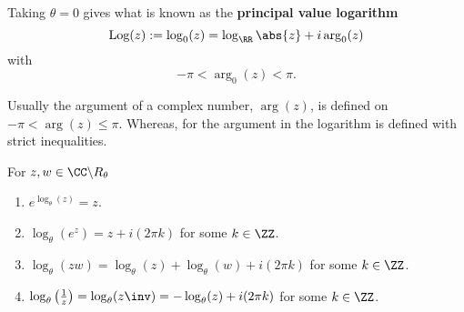 \documentclass[12pt, a4paper]{article}
\begin{document}
\begin{definition}
    Taking \(\theta=0\) gives what is known as the \textbf{principal value logarithm}
    \[\text{Log}(z) := \log_0(z) = \log_{\RR}\abs{z}+i\arg_0(z)\]
    with 
    \[-\pi < \arg_0(z)<\pi.\]
\end{definition}

\begin{mdremark}
    Usually the argument of a complex number, \(\arg(z)\), is defined on \(-\pi < \arg(z) \leq \pi\). Whereas, for the argument in the logarithm is defined with strict inequalities.
\end{mdremark}

\begin{proposition}
    For \(z,w \in \CC \backslash R_{\theta}\)
    \begin{enumerate}
        \item \(e^{\log_{\theta}(z)}=z\).
        \item \(\log_{\theta}(e^z)=z+i(2\pi k)\) for some \(k \in \ZZ\).
        \item \(\log_{\theta}(zw)=\log_{\theta}(z)+\log_{\theta}(w)+i(2\pi k)\) for some \(k \in \ZZ\).
        \item \(\log_{\theta} \left( \frac{1}{z} \right) = \log_{\theta}(z\inv) = -\log_{\theta}(z)+i(2\pi k)\) for some \(k \in \ZZ\).
    \end{enumerate}
\end{proposition}
\end{document}
